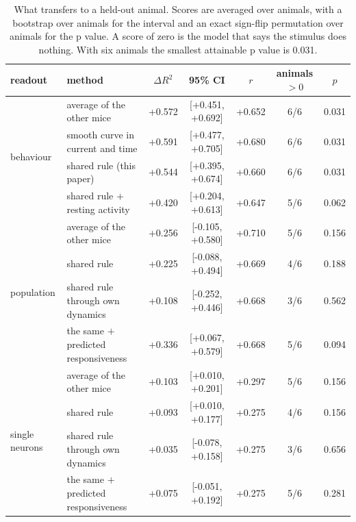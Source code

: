 \begin{table}[h]\centering\small
\caption{What transfers to a held-out animal. Scores are averaged over animals, with a bootstrap over animals for the interval and an exact sign-flip permutation over animals for the p value. A score of zero is the model that says the stimulus does nothing. With six animals the smallest attainable p value is 0.031.}
\label{tab:main}
\begin{tabular}{llccccc}
\toprule
readout & method & $\Delta R^2$ & 95\% CI & $r$ & animals $>0$ & $p$ \\
\midrule
\multirow{4}{*}{behaviour}
& average of the other mice & +0.572 & [+0.451, +0.692] & +0.652 & 6/6 & 0.031 \\
& smooth curve in current and time & +0.591 & [+0.477, +0.705] & +0.680 & 6/6 & 0.031 \\
& shared rule (this paper) & +0.544 & [+0.395, +0.674] & +0.660 & 6/6 & 0.031 \\
& shared rule $+$ resting activity & +0.420 & [+0.204, +0.613] & +0.647 & 5/6 & 0.062 \\
\midrule
\multirow{4}{*}{population}
& average of the other mice & +0.256 & [-0.105, +0.580] & +0.710 & 5/6 & 0.156 \\
& shared rule & +0.225 & [-0.088, +0.494] & +0.669 & 4/6 & 0.188 \\
& shared rule through own dynamics & +0.108 & [-0.252, +0.446] & +0.668 & 3/6 & 0.562 \\
& the same $+$ predicted responsiveness & +0.336 & [+0.067, +0.579] & +0.668 & 5/6 & 0.094 \\
\midrule
\multirow{4}{*}{single neurons}
& average of the other mice & +0.103 & [+0.010, +0.201] & +0.297 & 5/6 & 0.156 \\
& shared rule & +0.093 & [+0.010, +0.177] & +0.275 & 4/6 & 0.156 \\
& shared rule through own dynamics & +0.035 & [-0.078, +0.158] & +0.275 & 3/6 & 0.656 \\
& the same $+$ predicted responsiveness & +0.075 & [-0.051, +0.192] & +0.275 & 5/6 & 0.281 \\
\bottomrule
\end{tabular}
\end{table}

